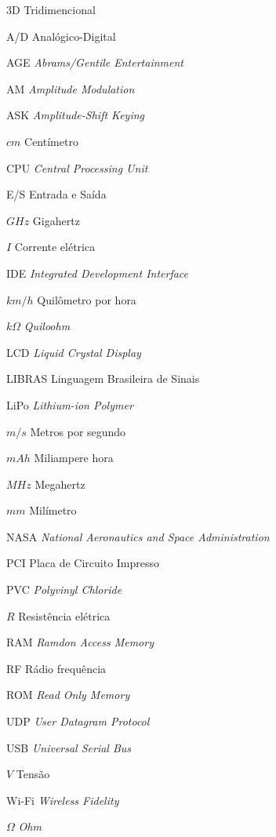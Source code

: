 \documentclass[
	12pt,				%
	openright,			%
	oneside,			%
	a4paper,			%
	english,			%
	brazil				%
	]{abntex2}
\begin{document}
\begin{siglas}

	\item[3D]Tridimencional
	\item[A/D]Analógico-Digital
	\item[AGE]\textit{Abrams/Gentile Entertainment}
	\item[AM]\textit{Amplitude Modulation}
	\item[ASK]\textit{Amplitude-Shift Keying}
	\item[$cm$]Centímetro
	\item[CPU]\textit{Central Processing Unit}
	\item[E/S]Entrada e Saída
	\item[$GHz$]Gigahertz
	\item[$I$]Corrente elétrica
	\item[IDE]\textit{Integrated Development Interface}
	\item[$km/h$]Quilômetro por hora
	\item[$k\Omega$]\textit{Quiloohm}
	\item[LCD]\textit{Liquid Crystal Display}
	\item[LIBRAS]Linguagem Brasileira de Sinais
	\item[LiPo]\textit{Lithium-ion Polymer}
	\item[$m/s$]Metros por segundo
	\item[$mAh$]Miliampere hora
	\item[$MHz$]Megahertz
	\item[$mm$]Milímetro
	\item[NASA]\textit{National Aeronautics and Space Administration}
	\item[PCI]Placa de Circuito Impresso
	\item[PVC]\textit{Polyvinyl Chloride}			
	\item[$R$]Resistência elétrica
	\item[RAM]\textit{Ramdon Access Memory}
	\item[RF]Rádio frequência
	\item[ROM]\textit{Read Only Memory}
	\item[UDP]\textit{User Datagram Protocol}
	\item[USB]\textit{Universal Serial Bus}
	\item[$V$]Tensão
	\item[Wi-Fi]\textit{Wireless Fidelity}
	\item[$\Omega$]\textit{Ohm}

	
\end{siglas}
\end{document}
